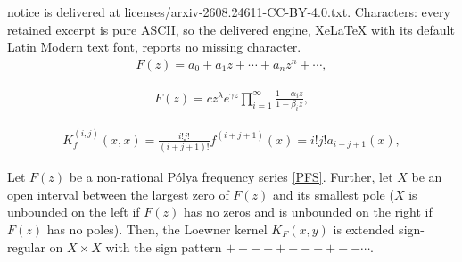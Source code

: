 \documentclass[10pt,a4paper]{amsart}
\begin{document}
notice is delivered at licenses/arxiv-2608.24611-CC-BY-4.0.txt. Characters: every retained excerpt is pure ASCII, so the delivered engine, XeLaTeX with its default Latin Modern text font, reports no missing character.
\begin{align}
\label{PFS-Taylor}
F(z) = a_0 + a_1z + \cdots + a_nz^n + \cdots,
\end{align}

\begin{align}
\label{PFS}
F(z) = cz^\lambda e^{\gamma z}\prod_{i=1}^\infty \frac{1+\alpha_iz}{1-\beta_i z},
\end{align}

\begin{align}
\label{der K}
K_f^{(i,j)}(x,x) = \frac{i!j!}{(i+j+1)!} f^{(i+j+1)}(x) = i!j! a_{i+j+1}(x),
\end{align}

\begin{proposition}
\label{prop:esr}
Let \( F(z) \) be a non-rational P\'olya frequency series \eqref{PFS}. Further, let \( X \) be an open interval between the largest zero of \( F(z) \) and its smallest pole (\( X \) is unbounded on the left if \( F(z) \) has no zeros and is unbounded on the right if \( F(z) \) has no poles). Then, the Loewner kernel \( K_F(x,y) \) is extended sign-regular on \( X\times X \) with the sign pattern \( +--++--++--\cdots\). 
\end{proposition}
\end{document}
